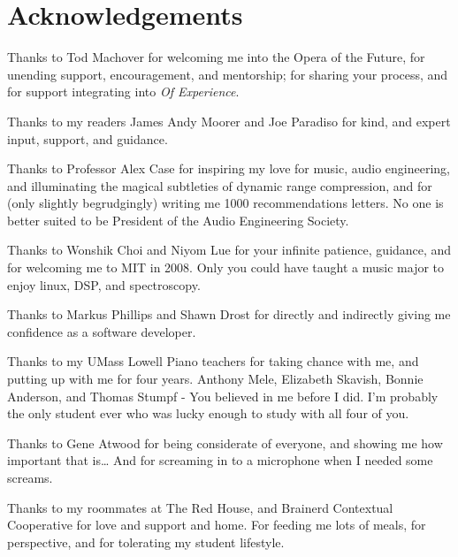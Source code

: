 \clearpage
\chapter*{Acknowledgements}
\label{ch:acknowledgements}
\begin{fullwidth}
  \noindent Thanks to Tod Machover for welcoming me into the Opera of
  the Future, for unending support, encouragement, and mentorship; for
  sharing your process, and for support integrating \thesis into
  \textit{Of Experience}.

\vspace{5mm}
\noindent Thanks to my readers James Andy Moorer and Joe Paradiso for
kind, and expert input, support, and guidance.

\vspace{5mm}
\noindent Thanks to Professor Alex Case for inspiring my love
for music, audio engineering, and illuminating the magical subtleties
of dynamic range compression, and for (only slightly begrudgingly)
writing me 1000 recommendations letters. No one is better suited to be
President of the Audio Engineering Society.

\vspace{5mm}
\noindent Thanks to Wonshik Choi and Niyom Lue for your infinite
patience, guidance, and for welcoming me to MIT in 2008. Only you
could have taught a music major to enjoy linux, DSP, and spectroscopy.

\vspace{5mm}
\noindent Thanks to Markus Phillips and Shawn Drost for directly and indirectly
giving me confidence as a software developer.

\vspace{5mm}
\noindent Thanks to my UMass Lowell Piano teachers for taking chance
with me, and putting up with me for four years. Anthony Mele,
Elizabeth Skavish, Bonnie Anderson, and Thomas Stumpf - You believed
in me before I did. I'm probably the only student ever who was lucky
enough to study with all four of you.

\vspace{5mm}
\noindent  Thanks to Gene Atwood for being considerate of everyone, and showing
me how important that is\ldots{} And for screaming in to a microphone when
I needed some screams.

\vspace{5mm}
\noindent Thanks to my roommates at The Red House, and Brainerd
Contextual Cooperative for love and support and home. For feeding me
lots of meals, for perspective, and for tolerating my student
lifestyle.


\end{fullwidth}
